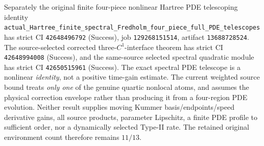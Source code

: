 \documentclass[11pt]{amsart}
\begin{document}
Separately the original finite four-piece nonlinear Hartree PDE
telescoping identity \texttt{actual\_Hartree\_finite\_spectral\_Fredholm\_four\_piece\_full\_PDE\_telescopes}
has strict CI \texttt{42648496792} (Success), job
\texttt{129268151514}, artifact \texttt{13688728524}.
The source-selected corrected three-\(C^1\)-interface theorem
has strict CI \texttt{42648994008} (Success), and the
same-source selected spectral quadratic module has strict CI
\texttt{42650515961} (Success).
The exact spectral PDE telescope is a nonlinear \emph{identity},
not a positive time-gain estimate. The current weighted source
bound treats \emph{only one} of the genuine quartic nonlocal atoms,
and assumes the physical correction envelope rather than producing
it from a four-region PDE evolution. Neither result supplies moving
Kummer basis/endpoints/speed derivative gains, all source products,
parameter Lipschitz, a finite PDE profile to sufficient order, nor
a dynamically selected Type-II rate. The retained original
environment count therefore remains \(11/13\).
\end{document}
